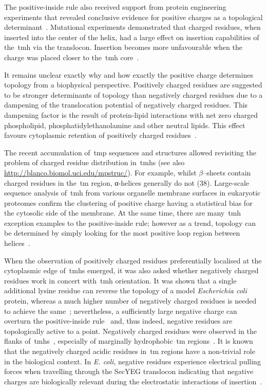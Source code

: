The positive-inside rule also received support from protein engineering experiments that revealed conclusive evidence for positive charges as a topological determinant~\cite{VonHeijne1989, Beltzer1991, Kida2006, Nilsson1990}.
Mutational experiments demonstrated that charged residues, when inserted into the center of the helix, had a large effect on insertion capabilities of the~\gls{tmh} via the translocon.
Insertion becomes more unfavourable when the charge was placed closer to the~\gls{tmh} core~\cite{Hessa2005}.

It remains unclear exactly why and how exactly the positive charge determines topology from a biophysical perspective.
Positively charged residues are suggested to be stronger determinants of topology than negatively charged residues due to a dampening of the translocation potential of negatively charged residues.
This dampening factor is the result of protein-lipid interactions with net zero charged phospholipid, phosphatidylethanolamine and other neutral lipids.
This effect favours cytoplasmic retention of positively charged residues~\cite{Bogdanov2014}.

The recent accumulation of~\gls{tmp} sequences and structures allowed revisiting the problem of charged residue distribution in~\gls{tmh}s (see also \url{http://blanco.biomol.uci.edu/mpstruc/}).
For example, whilst \(\beta\)--sheets contain charged residues in the~\gls{tm} region, α-helices generally do not (38).
Large-scale sequence analysis of~\gls{tmh} from various organelle membrane surfaces in eukaryotic proteomes confirm the clustering of positive charge having a statistical bias for the cytosolic side of the membrane.
At the same time, there are many~\gls{tmh} exception examples to the positive-inside rule; however as a trend, topology can be determined by simply looking for the most positive loop region between helices~\cite{Sharpe2010, Baeza-Delgado2013}.

When the observation of positively charged residues preferentially localised at the cytoplasmic edge of~\gls{tmh}s emerged, it was also asked whether negatively charged residues work in concert with~\gls{tmh} orientation.
It was shown that a single additional lysine residue can reverse the topology of a model \textit{Escherichia coli} protein, whereas a much higher number of negatively charged residues is needed to achieve the same~\cite{Nilsson1990}; nevertheless, a sufficiently large negative charge can overturn the positive-inside rule~\cite{Andersson1993, Kim1994} and, thus indeed, negative residues are topologically active to a point.
Negatively charged residues were observed in the flanks of~\gls{tmh}s~\cite{Baeza-Delgado2013}, especially of marginally hydrophobic~\gls{tm} regions~\cite{Delgado-Partin1998}.
It is known that the negatively charged acidic residues in~\gls{tm} regions have a non-trivial role in the biological context.
In \textit{E.
coli}, negative residues experience electrical pulling forces when travelling through the SecYEG translocon indicating that negative charges are biologically relevant during the electrostatic interactions of insertion~\cite{Ismail2012, Ismail2015}.

